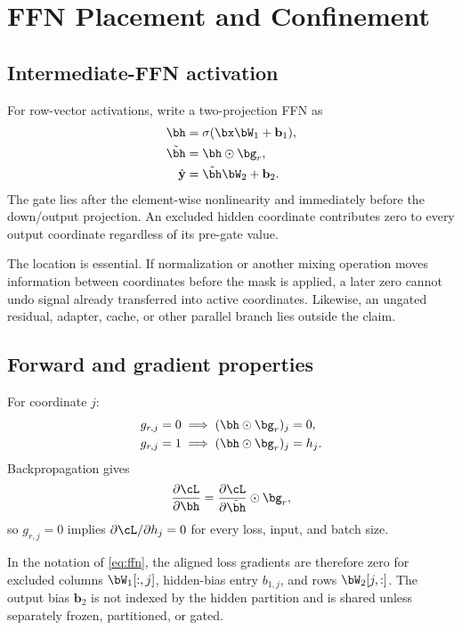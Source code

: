 \documentclass[11pt]{article}
\begin{document}
\section{FFN Placement and Confinement}

\subsection{Intermediate-FFN activation}

For row-vector activations, write a two-projection FFN as
\begin{align}
  \bh &= \sigma(\bx\bW_1+\mathbf b_1), \\
  \tilde{\bh} &= \bh\odot\bg_r, \\
  \hat{\mathbf y} &= \tilde{\bh}\bW_2+\mathbf b_2.
  \label{eq:ffn}
\end{align}
The gate lies after the element-wise nonlinearity and immediately before the
down/output projection. An excluded hidden coordinate contributes zero to every
output coordinate regardless of its pre-gate value.

The location is essential. If normalization or another mixing operation moves
information between coordinates before the mask is applied, a later zero cannot
undo signal already transferred into active coordinates. Likewise, an ungated
residual, adapter, cache, or other parallel branch lies outside the claim.

\subsection{Forward and gradient properties}

For coordinate $j$:
\begin{align}
g_{r,j}=0 &\implies (\bh\odot\bg_r)_j=0, \\
g_{r,j}=1 &\implies (\bh\odot\bg_r)_j=h_j.
\end{align}
Backpropagation gives
\begin{equation}
  \frac{\partial\cL}{\partial\bh}
  =\frac{\partial\cL}{\partial\tilde{\bh}}\odot\bg_r,
  \label{eq:gradient}
\end{equation}
so $g_{r,j}=0$ implies $\partial\cL/\partial h_j=0$ for every loss,
input, and batch size.

In the notation of \cref{eq:ffn}, the aligned loss gradients are therefore zero
for excluded columns $\bW_1[:,j]$, hidden-bias entry $b_{1,j}$, and rows
$\bW_2[j,:]$. The output bias $\mathbf b_2$ is not indexed by the hidden
partition and is shared unless separately frozen, partitioned, or gated.
\end{document}
